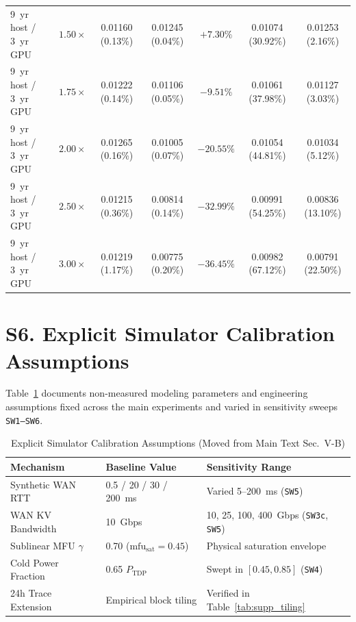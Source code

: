 \documentclass[11pt,a4paper]{article}
\begin{document}
\begin{table}[ht]
{\begin{tabular}{@{}llccccc@{}}
9~yr host / 3~yr GPU & $1.50\times$ & 0.01160 (0.13\%) & 0.01245 (0.04\%) & $+7.30\%$ & 0.01074 (30.92\%) & 0.01253 (2.16\%) \\
9~yr host / 3~yr GPU & $1.75\times$ & 0.01222 (0.14\%) & 0.01106 (0.05\%) & $-9.51\%$ & 0.01061 (37.98\%) & 0.01127 (3.03\%) \\
9~yr host / 3~yr GPU & $2.00\times$ & 0.01265 (0.16\%) & 0.01005 (0.07\%) & $-20.55\%$ & 0.01054 (44.81\%) & 0.01034 (5.12\%) \\
9~yr host / 3~yr GPU & $2.50\times$ & 0.01215 (0.36\%) & 0.00814 (0.14\%) & $-32.99\%$ & 0.00991 (54.25\%) & 0.00836 (13.10\%) \\
9~yr host / 3~yr GPU & $3.00\times$ & 0.01219 (1.17\%) & 0.00775 (0.20\%) & $-36.45\%$ & 0.00982 (67.12\%) & 0.00791 (22.50\%) \\
\bottomrule
\end{tabular}%
}
\end{table}

\section*{S6. Explicit Simulator Calibration Assumptions}
Table~\ref{tab:supp_calibrations} documents non-measured modeling parameters and engineering assumptions fixed across the main experiments and varied in sensitivity sweeps \texttt{SW1--SW6}.

\begin{table}[ht]
\centering
\scriptsize
\caption{Explicit Simulator Calibration Assumptions (Moved from Main Text Sec.~V-B)}
\label{tab:supp_calibrations}
\begin{tabular}{@{}lll@{}}
\toprule
\textbf{Mechanism} & \textbf{Baseline Value} & \textbf{Sensitivity Range} \\
\midrule
Synthetic WAN RTT & 0.5 / 20 / 30 / 200~ms & Varied 5--200~ms (\texttt{SW5}) \\
WAN KV Bandwidth & 10~Gbps & 10, 25, 100, 400~Gbps (\texttt{SW3c}, \texttt{SW5}) \\
Sublinear MFU $\gamma$ & 0.70 ($\text{mfu}_{\text{sat}}=0.45$) & Physical saturation envelope \\
Cold Power Fraction & 0.65 $P_{\text{TDP}}$ & Swept in $[0.45, 0.85]$ (\texttt{SW4}) \\
24h Trace Extension & Empirical block tiling & Verified in Table~\ref{tab:supp_tiling} \\
\bottomrule
\end{tabular}
\end{table}
\end{document}
